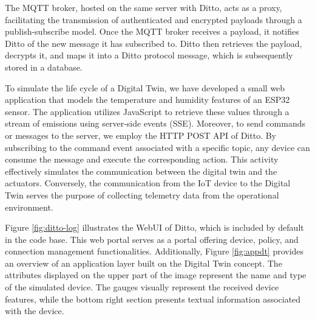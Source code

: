 The MQTT broker, hosted on the same server  with Ditto, acts as a proxy, facilitating the transmission of authenticated and encrypted payloads through a publish-subscribe model. Once the MQTT broker receives a payload, it  notifies Ditto of the new message it has subscribed to. Ditto then retrieves the payload, decrypts it, and maps it into a Ditto protocol message, which is subsequently stored in a database.

To simulate the life cycle of a Digital Twin, we have developed a small web application that models the temperature and humidity features of an ESP32 sensor. The application utilizes JavaScript to retrieve these values through a stream of emissions using server-side events (SSE). Moreover, to send commands or messages to the server, we employ the HTTP POST API of Ditto. By subscribing to the command event associated with a specific topic, any device can consume the message and execute the corresponding action. This activity effectively simulates the communication between the digital twin and the actuators. Conversely, the communication from the IoT device to the Digital Twin serves the purpose of collecting telemetry data from the operational environment.

Figure \ref{fig:ditto-log} illustrates the WebUI of Ditto, which is included by default in the code base. This web portal serves as a portal offering device, policy, and connection management functionalities. Additionally, Figure \ref{fig:appdt} provides an overview of an application layer built on the Digital Twin concept. The attributes displayed on the upper part of the image represent the name and type of the simulated device. The gauges visually represent the received device features, while the bottom right section presents textual information associated with the device.
 
